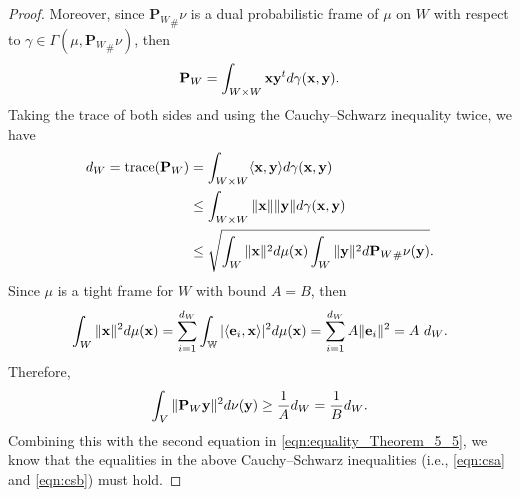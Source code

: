 \documentclass{amsart}
\numberwithin{equation}{section}
\DeclareMathOperator{\trace}{trace}
\newcommand{\bP}{{\mathbf P}}
\theoremstyle{plain}
\theoremstyle{remark}
\theoremstyle{definition}
\begin{document}
\begin{proof}
Moreover, since ${\bP_W}_\#\nu$ is a dual probabilistic frame of $\mu$ on $W$ with respect to $\gamma \in \Gamma(\mu, {\bP_W}_\#\nu)$, then
\begin{equation*}
    \bP_{W} = \int_{W \times W} {\bf x}{\bf y}^t d\gamma({\bf x, y}).
\end{equation*}
Taking the trace of both sides and using the Cauchy–Schwarz inequality twice, we have
\begin{align}
      d_W = \trace(\bP_{W}) &= \int_{W \times W} \langle {\bf x, y} \rangle d\gamma({\bf x, y}) \nonumber\\
       &\leq \int_{W \times W} \| {\bf x} \| \| {\bf  y} \| d\gamma({\bf x, y}) \label{eqn:csa}\\
      & \leq \sqrt{\int_{W}  \Vert {\bf x}  \Vert ^2  d\mu({\bf x}) \int_{W}  \Vert {\bf y}  \Vert ^2  d{\bP_W}_\#\nu({\bf y})}.\label{eqn:csb}
 \end{align}
Since $\mu$ is a tight frame for $W$ with bound $A=B$, then 
\begin{equation*}
    \int_{W}  \Vert {\bf x}  \Vert ^2  d\mu({\bf x}) = \sum_{i=1}^{d_W} \int_{\mathbb{W}}   |\langle {\bf e}_i, {\bf x} \rangle|^2  d\mu({\bf x}) = \sum_{i=1}^{d_W} A \Vert{\bf e}_i \Vert^2 =  A \ d_W.
\end{equation*}
Therefore, 
\begin{equation*}
   \int_{V}  \Vert {\bP_W\bf y}  \Vert ^2  d\nu({\bf y}) \geq  \frac{1}{A}d_W = \frac{1}{B}d_W. 
\end{equation*}
Combining this with the second equation in \eqref{eqn:equality_Theorem_5_5}, we know that the equalities in the above Cauchy–Schwarz inequalities (i.e., \eqref{eqn:csa} and \eqref{eqn:csb}) must hold. 


\end{proof}
\end{document}
